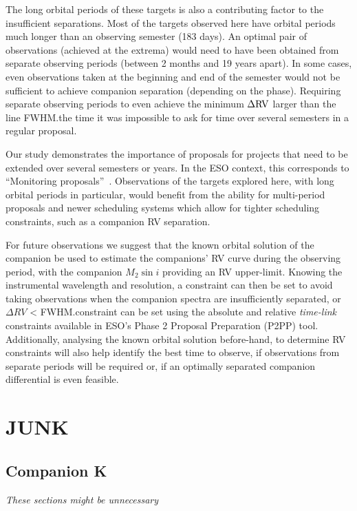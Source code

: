 The long orbital periods of these targets is also a contributing factor to the insufficient separations. Most of the targets observed here have orbital periods much longer than an observing semester (183 days). An optimal pair of observations (achieved at the extrema) would need to have been obtained from separate observing periods (between 2 months and 19 years apart). In some cases, even observations taken at the beginning and end of the semester would not be sufficient to achieve companion separation (depending on the phase). Requiring separate observing periods to even achieve the minimum \(\Delta \rm {RV}\) larger than the line {FWHM}.\@At the time it was impossible to ask for time over several semesters in a regular proposal.

Our study demonstrates the importance of proposals for projects that need to be extended over several semesters or years. In the ESO context, this corresponds to ``Monitoring proposals''~\citep[e.g.,][pg. 18]{eso_eso_2017}. Observations of the targets explored here, with long orbital periods in particular, would benefit from the ability for multi-period proposals and newer scheduling systems which allow for tighter scheduling constraints, such as a companion {RV} separation.

For future observations we suggest that the known orbital solution of the companion be used to estimate the companions' {RV} curve during the observing period, with the companion \(M_2\sin{i}\) providing an {RV} upper-limit. Knowing the instrumental wavelength and resolution, a constraint can then be set to avoid taking observations when the companion spectra are insufficiently separated, or \(\Delta {RV}\) < {FWHM}.\@This constraint can be set using the absolute and relative \emph{time-link} constraints available in ESO's Phase 2 Proposal Preparation (P2PP) tool.
Additionally, analysing the known orbital solution before-hand, to determine {RV} constraints will also help identify the best time to observe, if observations from separate periods will be required or, if an optimally separated companion differential is even feasible.





\section{JUNK}


\subsection{Companion K}
\label{sec:companion_RV}
\emph{These sections might be unnecessary}\\


